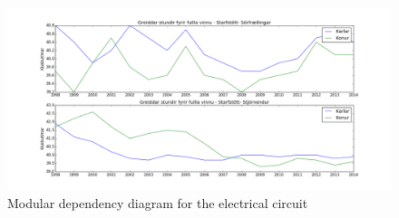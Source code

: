 \documentclass[12pt, svn, draft]{rureport}
\begin{document}
\begin{figure}
	\centering 
	\includegraphics[scale=0.7]{../graphics/unnir_timar2.png}
	\caption{Modular dependency diagram for the electrical circuit \label{fig:unnirtimar2}}
\end{figure}

%
\printbibliography
\end{document}
